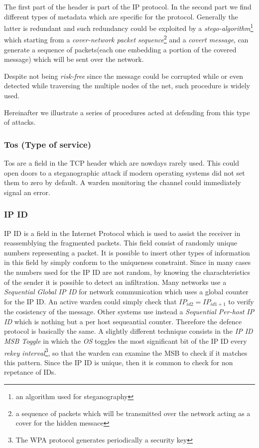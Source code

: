 \documentclass[../../main.tex]{subfiles}
\begin{document}
The first part of the header is part of the IP protocol.
In the second part we find different types of metadata which
are specific for the protocol. Generally the latter is redundant and such redundancy
could be exploited by a \emph{stego-algorithm}\footnote{an
algorithm used for steganography} which starting from a \emph{cover-network
packet sequence}\footnote{a sequence of packets which will be transmitted
over the network acting as a cover for the hidden messace} and a
\emph{covert message}, can generate a sequence of packets(each one embedding
a portion of the covered message) which will be sent over the network.

Despite not being \emph{risk-free} since the message could be corrupted while or even detected
while traversing the multiple nodes of the net, such procedure is widely used.

Hereinafter we illustrate a series of procedures acted at defending from this type of attacks.

\subsubsection{Tos (Type of service)}
Tos are a field in the TCP header which
are nowdays rarely used. This could open doors to a steganographic attack if
modern operating systems did not set them to zero by default.
A warden monitoring the channel could immediately signal an error.

\subsubsection{IP ID} IP ID is a field in the Internet Protocol which is used to
assist the receiver in reassemblying the fragmented packets.
This field consist of randomly unique numbers representing a packet.
It is possible to insert other types of information in this field by simply
conform to the uniqueness constraint.
Since in many cases the numbers used for the IP ID are not random, by
knowing the charachteristics of the sender it is possible to detect an
infiltration. Many networks use a \emph{Sequential Global IP ID} for network communication which uses a global counter for the
IP ID. An active warden could simply check that $IP_{id2} = IP_{id1+1}$ to verify the cosistency of the message. Other systems use instead a \emph{Sequential Per-host IP ID} which is nothing but a per host sequeantial counter. 
Therefore the defence protocol is basically the same. A slightly different technique consists in the \emph{IP ID MSB Toggle} in which the \emph{OS} toggles the most significant bit of the IP ID every \emph{rekey interval}\footnote{The WPA protocol generates periodically a security key},
so that the warden can examine the MSB to check if it matches this pattern. Since the IP ID is unique, then it is common to check for non repetance of IDs.
\end{document}
